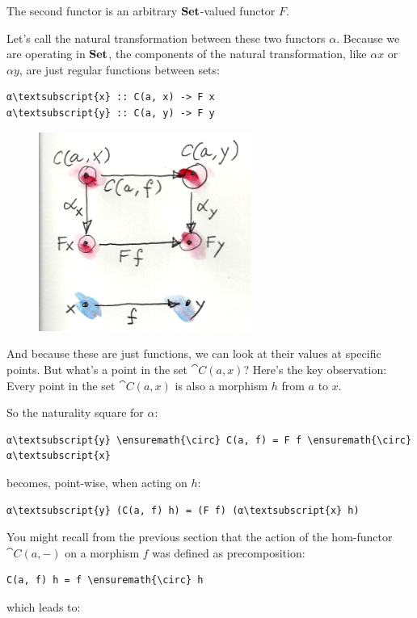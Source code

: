 The second functor is an arbitrary $\mathbf{Set}$-valued functor
$F$.

Let's call the natural transformation between these two functors
$\alpha$. Because we are operating in $\mathbf{Set}$, the components of
the natural transformation, like $αx$ or $αy$, are just
regular functions between sets:

\begin{Verbatim}
α\textsubscript{x} :: C(a, x) -> F x
α\textsubscript{y} :: C(a, y) -> F y
\end{Verbatim}

\begin{figure}[H]
\centering
\includegraphics[width=2.73958in]{images/yoneda1.png}
\end{figure}

\noindent
And because these are just functions, we can look at their values at
specific points. But what's a point in the set $\cat{C}(a, x)$? Here's
the key observation: Every point in the set $\cat{C}(a, x)$ is also a
morphism $h$ from $a$ to $x$.

So the naturality square for $α$:

\begin{Verbatim}[commandchars=\\\{\}]
α\textsubscript{y} \ensuremath{\circ} C(a, f) = F f \ensuremath{\circ} α\textsubscript{x}
\end{Verbatim}
becomes, point-wise, when acting on $h$:

\begin{Verbatim}[commandchars=\\\{\}]
α\textsubscript{y} (C(a, f) h) = (F f) (α\textsubscript{x} h)
\end{Verbatim}
You might recall from the previous section that the action of the
hom-functor $\cat{C}(a,-)$ on a morphism $f$ was defined as
precomposition:

\begin{Verbatim}[commandchars=\\\{\}]
C(a, f) h = f \ensuremath{\circ} h
\end{Verbatim}
which leads to:

